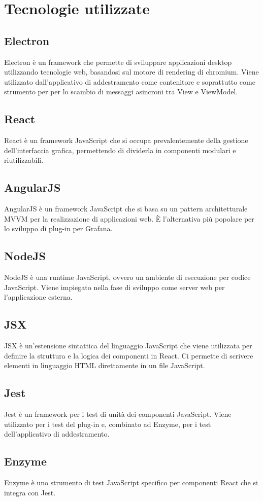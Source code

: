 \section{Tecnologie utilizzate}
	\subsection{Electron}
		Electron è un framework che permette di sviluppare applicazioni desktop utilizzando tecnologie web, basandosi sul motore di rendering di chromium. Viene utilizzato dall'applicativo di addestramento come contenitore e soprattutto come strumento per per lo scambio di messaggi asincroni tra View e ViewModel.
	\subsection{React}
		React è un framework JavaScript che si occupa prevalentemente della gestione dell'interfaccia grafica, permettendo di dividerla in componenti modulari e riutilizzabili.
	\subsection{AngularJS}
		AngularJS è un framework JavaScript che si basa su un pattern architetturale MVVM per la realizzazione di applicazioni web. È l'alternativa più popolare per lo sviluppo di plug-in per Grafana\glo.
	\subsection{NodeJS}
		NodeJS è una runtime JavaScript, ovvero un ambiente di esecuzione per codice JavaScript. Viene impiegato nella fase di sviluppo come server web per l'applicazione esterna.
	\subsection{JSX}
		JSX è un'estensione sintattica del linguaggio JavaScript che viene utilizzata per definire la struttura e la logica dei componenti in React. Ci permette di scrivere elementi in linguaggio HTML direttamente in un file JavaScript.
	\subsection{Jest}
		Jest è un framework per i test di unità dei componenti JavaScript. Viene utilizzato per i test del plug-in e, combinato ad Enzyme, per i test dell'applicativo di addestramento.
	\subsection{Enzyme}
		Enzyme è uno strumento di test JavaScript specifico per componenti React che si integra con Jest.
